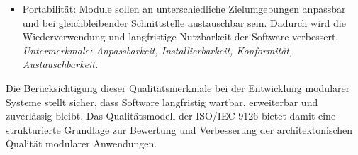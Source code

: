 \begin{itemize}
    \item Portabilität:
    Module sollen an unterschiedliche Zielumgebungen anpassbar und bei gleichbleibender Schnittstelle austauschbar sein.
    Dadurch wird die Wiederverwendung und langfristige Nutzbarkeit der Software verbessert.
    \emph{Untermerkmale: Anpassbarkeit, Installierbarkeit, Konformität, Austauschbarkeit.}
\end{itemize}

Die Berücksichtigung dieser Qualitätsmerkmale bei der Entwicklung modularer Systeme stellt sicher, dass Software langfristig wartbar, erweiterbar und zuverlässig bleibt.
Das Qualitätsmodell der ISO/IEC 9126 bietet damit eine strukturierte Grundlage zur Bewertung und Verbesserung der architektonischen Qualität modularer Anwendungen. \cite{ISOIEC9126-1991}


\pagebreak